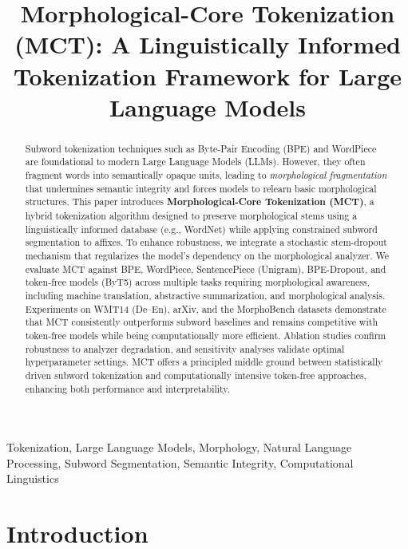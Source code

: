 \documentclass[conference]{IEEEtran}
\begin{document}
\title{Morphological-Core Tokenization (MCT): A Linguistically Informed Tokenization Framework for Large Language Models}

\author{
}

\maketitle

\begin{abstract}
Subword tokenization techniques such as Byte-Pair Encoding (BPE) and WordPiece are foundational to modern Large Language Models (LLMs). However, they often fragment words into semantically opaque units, leading to \textit{morphological fragmentation} that undermines semantic integrity and forces models to relearn basic morphological structures. This paper introduces \textbf{Morphological-Core Tokenization (MCT)}, a hybrid tokenization algorithm designed to preserve morphological stems using a linguistically informed database (e.g., WordNet) while applying constrained subword segmentation to affixes. To enhance robustness, we integrate a stochastic stem-dropout mechanism that regularizes the model's dependency on the morphological analyzer. We evaluate MCT against BPE, WordPiece, SentencePiece (Unigram), BPE-Dropout, and token-free models (ByT5) across multiple tasks requiring morphological awareness, including machine translation, abstractive summarization, and morphological analysis. Experiments on WMT14 (De–En), arXiv, and the MorphoBench datasets demonstrate that MCT consistently outperforms subword baselines and remains competitive with token-free models while being computationally more efficient. Ablation studies confirm robustness to analyzer degradation, and sensitivity analyses validate optimal hyperparameter settings. MCT offers a principled middle ground between statistically driven subword tokenization and computationally intensive token-free approaches, enhancing both performance and interpretability.
\end{abstract}

\begin{IEEEkeywords}
Tokenization, Large Language Models, Morphology, Natural Language Processing, Subword Segmentation, Semantic Integrity, Computational Linguistics
\end{IEEEkeywords}

\section{Introduction}
\label{sec:intro}
\end{document}
